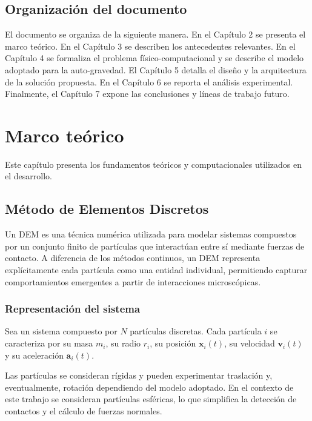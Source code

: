\documentclass[a4paper,11pt]{book}
\begin{document}
\section{Organización del documento}

El documento se organiza de la siguiente manera. En el Capítulo 2 se presenta el marco teórico. En el Capítulo 3 se describen los antecedentes relevantes. En el Capítulo 4 se formaliza el problema físico-computacional y se describe el modelo adoptado para la auto-gravedad. El Capítulo 5 detalla el diseño y la arquitectura de la solución propuesta. En el Capítulo 6 se reporta el análisis experimental. Finalmente, el Capítulo 7 expone las conclusiones y líneas de trabajo futuro.

\chapter{Marco teórico}

Este capítulo presenta los fundamentos teóricos y computacionales utilizados en el desarrollo.

\section{Método de Elementos Discretos}

Un DEM es una técnica numérica utilizada para modelar sistemas compuestos por un conjunto finito de partículas que interactúan entre sí mediante fuerzas de contacto. A diferencia de los métodos continuos, un DEM representa explícitamente cada partícula como una entidad individual, permitiendo capturar comportamientos emergentes a partir de interacciones microscópicas.

\subsection{Representación del sistema}

Sea un sistema compuesto por $N$ partículas discretas. Cada partícula $i$ se caracteriza por su masa $m_i$, su radio $r_i$, su posición $\mathbf{x}_i(t)$, su velocidad $\mathbf{v}_i(t)$ y su aceleración $\mathbf{a}_i(t)$.

Las partículas se consideran rígidas y pueden experimentar traslación y, eventualmente, rotación dependiendo del modelo adoptado. En el contexto de este trabajo se consideran partículas esféricas, lo que simplifica la detección de contactos y el cálculo de fuerzas normales.
\end{document}
